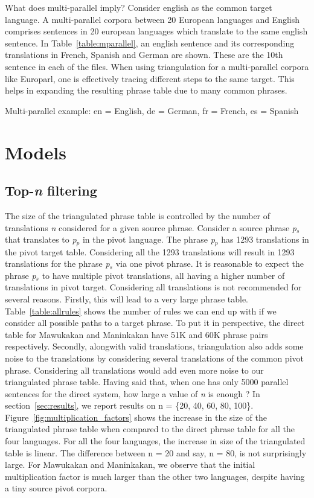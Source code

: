 What does multi-parallel imply? Consider english as the common target language. A multi-parallel corpora between 20 European languages and English comprises sentences in 20 european languages which translate to the same english sentence. In Table~\ref{table:mparallel}, an english sentence and its corresponding translations in French, Spanish and German are shown. These are the 10th sentence in each of the files. When using triangulation for a multi-parallel corpora like Europarl, one is effectively tracing different steps to the same target. This helps in expanding the resulting phrase table due to many common phrases. 

\begin{table*}
	\small
	\centering
	\small
	
	\caption{Multi-parallel example: en = English, de = German, fr = French, es = Spanish}
	\label{table:mparallel}
\end{table*}


\section{Models}
\label{sec:models}

\subsection{Top-\emph{n} filtering}
\label{subsec:topn}
 The size of the triangulated phrase table is controlled by the number of translations \emph{n} considered for a given source phrase. Consider a source phrase \emph{p$_s$} that translates to \emph{p$_p$} in the pivot language. The phrase \emph{p$_p$} has 1293 translations in the pivot target table. Considering all the 1293 translations will result in 1293 translations for the phrase \emph{p$_s$} via one pivot phrase. It is reasonable to expect the phrase \emph{p$_s$} to have multiple pivot translations, all having a higher number of translations in pivot target. Considering all translations is not recommended for several reasons. Firstly, this will lead to a very large phrase table. Table~\ref{table:allrules} shows the number of rules we can end up with if we consider all possible paths to a target phrase. To put it in perspective, the direct table for Mawukakan and Maninkakan have 51K and 60K phrase pairs respectively. Secondly, alongwith valid translations, triangulation also adds some noise to the translations by considering several translations of the common pivot phrase. Considering all translations would add even more noise to our triangulated phrase table. Having said that, when one has only 5000 parallel sentences for the direct system, how large a value of \emph{n} is enough ? In section~\ref{sec:results}, we report results on n = \{20, 40, 60, 80, 100\}. Figure~\ref{fig:multiplication_factors} shows the increase in the size of the triangulated phrase table when compared to the direct phrase table for all the four languages. For all the four languages, the increase in size of the triangulated table is linear. The difference between n = 20 and say, n = 80, is not surprisingly large. For Mawukakan and Maninkakan, we observe that the initial multiplication factor is much larger than the other two languages, despite having a tiny source pivot corpora.

